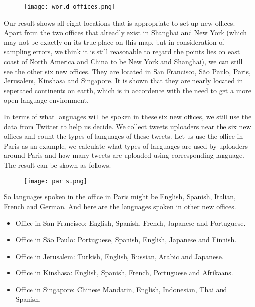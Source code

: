 \documentclass{mcmthesis}
\begin{document}
  \begin{figure}
    \small
    \centering
    \texttt{[image: world\_offices.png]}
  \end{figure}
  \newpage

  \indent Our result shows all eight locations that is appropriate to set up new offices. Apart from the two offices that alreadly exist in Shanghai and New York (which may not be exactly on its true place on this map, but in consideration of sampling errors, we think it is still reasonable to regard the points lies on east coast of North America and China to be New York and Shanghai), we can still see the other six new offices. They are located in San Francisco, São Paulo, Paris, Jerusalem, Kinshasa and Singapore. It is shown that they are nearly located in seperated continents on earth, which is in accordence with the need to get a more open language environment.

  \indent In terms of what languages will be spoken in these six new offices, we still use the data from Twitter to help us decide. We collect tweets uploaders near the six new offices and count the types of languages of these tweets. Let us use the office in Paris as an example, we calculate what types of languages are used by uploaders around Paris and how many tweets are uploaded using corresponding language. The result can be shown as follows.

  \begin{figure}
    \small
    \centering
    \texttt{[image: paris.png]}
  \end{figure}
  \newpage

  \indent So languages spoken in the office in Paris might be English, Spanish, Italian, French and German. And here are the languages spoken in other new offices.
  \begin{itemize}
    \item Office in San Francisco: English, Spanish, French, Japanese and Portuguese.
    \item Office in São Paulo: Portuguese, Spanish, English, Japanese and Finnish.
    \item Office in Jerusalem: Turkish, English, Russian, Arabic and Japanese.
    \item Office in Kinshasa: English, Spanish, French, Portuguese and Afrikaans.
    \item Office in Singapore: Chinese Mandarin, English, Indonesian, Thai and Spanish.
  \end{itemize} 
\end{document}

